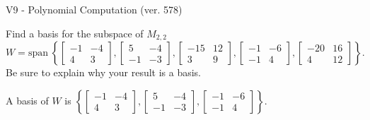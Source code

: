 \begin{exercise}
  \begin{exerciseTitle}V9 - Polynomial Computation (ver. 578)\end{exerciseTitle}
  \begin{exerciseStatement}
    Find a basis for the subspace of \(M_{2,2}\) 
\[W=\mathrm{span}\ \left\{\left[\begin{array}{cc}
-1 & -4 \\
4 & 3
\end{array}\right] , \left[\begin{array}{cc}
5 & -4 \\
-1 & -3
\end{array}\right] , \left[\begin{array}{cc}
-15 & 12 \\
3 & 9
\end{array}\right] , \left[\begin{array}{cc}
-1 & -6 \\
-1 & 4
\end{array}\right] , \left[\begin{array}{cc}
-20 & 16 \\
4 & 12
\end{array}\right]\right\}.\]
 Be sure to explain why your result is a basis.


  \end{exerciseStatement}
  \begin{exerciseAnswer}
   A basis of \(W\) is  \(\left\{\left[\begin{array}{cc}
-1 & -4 \\
4 & 3
\end{array}\right] , \left[\begin{array}{cc}
5 & -4 \\
-1 & -3
\end{array}\right] , \left[\begin{array}{cc}
-1 & -6 \\
-1 & 4
\end{array}\right]\right\}\).
  


  \end{exerciseAnswer}
\end{exercise}